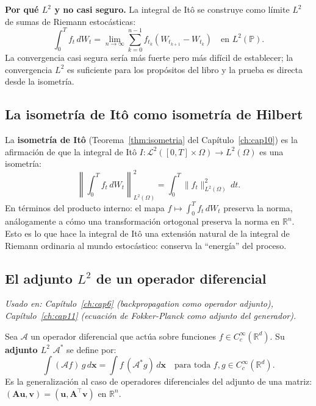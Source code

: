 \medskip\noindent\textbf{Por qué $L^2$ y no casi seguro.} La integral de Itô
se construye como límite $L^2$ de sumas de Riemann estocásticas:
\[
  \int_0^T f_t\,dW_t = \lim_{n\to\infty}\sum_{k=0}^{n-1}f_{t_k}(W_{t_{k+1}}-W_{t_k})
  \quad\text{en }L^2(\mathbb{P}).
\]
La convergencia casi segura sería más fuerte pero más difícil de establecer;
la convergencia $L^2$ es suficiente para los propósitos del libro y la prueba
es directa desde la isometría.

\subsection{La isometría de Itô como isometría de Hilbert}
\label{subsec:ap_isometria}

La \textbf{isometría de Itô} (Teorema~\ref{thm:isometria} del
Capítulo~\ref{ch:cap10}) es la afirmación de que la integral de Itô
$I: \mathcal{L}^2([0,T]\times\Omega) \to L^2(\Omega)$ es una isometría:
\begin{equation}
  \left\|\int_0^T f_t\,dW_t\right\|_{L^2(\Omega)}^2
  = \int_0^T\|f_t\|_{L^2(\Omega)}^2\,dt.
  \label{eq:ap_iso_ito}
\end{equation}
En términos del producto interno: el mapa $f\mapsto\int_0^T f_t\,dW_t$ preserva
la norma, análogamente a cómo una transformación ortogonal preserva la norma
en $\mathbb{R}^n$. Esto es lo que hace la integral de Itô una extensión
natural de la integral de Riemann ordinaria al mundo estocástico: conserva
la ``energía'' del proceso.

\subsection{El adjunto $L^2$ de un operador diferencial}
\label{subsec:ap_adjunto_l2}

\textit{Usado en: Capítulo~\ref{ch:cap6} (backpropagation como operador adjunto),
Capítulo~\ref{ch:cap11} (ecuación de Fokker-Planck como adjunto del generador).}

\medskip
Sea $\mathcal{A}$ un operador diferencial que actúa sobre funciones $f\in C_c^\infty
(\mathbb{R}^d)$. Su \textbf{adjunto $L^2$} $\mathcal{A}^*$ se define por:
\begin{equation}
  \int (\mathcal{A}f)\,g\,d\bm{x} = \int f\,(\mathcal{A}^*g)\,d\bm{x}
  \quad\text{para toda }f,g\in C_c^\infty(\mathbb{R}^d).
  \label{eq:ap_adjunto_def}
\end{equation}
Es la generalización al caso de operadores diferenciales del adjunto de una
matriz: $(\bm{A}\bm{u},\bm{v}) = (\bm{u},\bm{A}^\top\bm{v})$ en $\mathbb{R}^n$.


